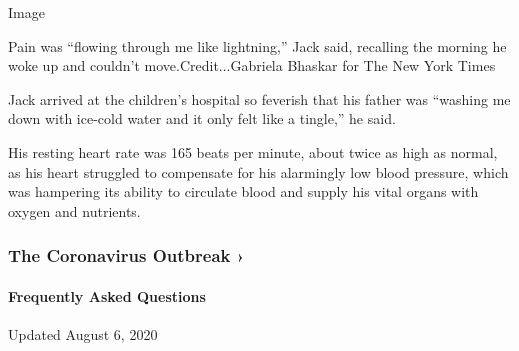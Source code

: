 Image

Pain was ``flowing through me like lightning,'' Jack said, recalling the
morning he woke up and couldn't move.Credit...Gabriela Bhaskar for The
New York Times

Jack arrived at the children's hospital so feverish that his father was
``washing me down with ice-cold water and it only felt like a tingle,''
he said.

His resting heart rate was 165 beats per minute, about twice as high as
normal, as his heart struggled to compensate for his alarmingly low
blood pressure, which was hampering its ability to circulate blood and
supply his vital organs with oxygen and nutrients.

\href{https://www.nytimes.com/news-event/coronavirus?action=click\&pgtype=Article\&state=default\&region=MAIN_CONTENT_3\&context=storylines_faq}{}

\hypertarget{the-coronavirus-outbreak-}{%
\subsubsection{The Coronavirus Outbreak
›}\label{the-coronavirus-outbreak-}}

\hypertarget{frequently-asked-questions}{%
\paragraph{Frequently Asked
Questions}\label{frequently-asked-questions}}

Updated August 6, 2020

